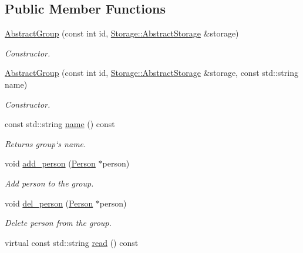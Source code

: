 \subsection*{Public Member Functions}
\begin{DoxyCompactItemize}
\item 
\hyperlink{classCore_1_1AbstractGroup_a9d5c82db4ed051f674e6a3f5586ad5e0}{AbstractGroup} (const int id, \hyperlink{classStorage_1_1AbstractStorage}{Storage::AbstractStorage} \&storage)
\begin{DoxyCompactList}\small\item\em Constructor. \item\end{DoxyCompactList}\item 
\hyperlink{classCore_1_1AbstractGroup_a2b6c9e7b2d618019fe626d28a53ddd06}{AbstractGroup} (const int id, \hyperlink{classStorage_1_1AbstractStorage}{Storage::AbstractStorage} \&storage, const std::string name)
\begin{DoxyCompactList}\small\item\em Constructor. \item\end{DoxyCompactList}\item 
const std::string \hyperlink{classCore_1_1AbstractGroup_a139cc0a6451f2dbca1f74d96f28741f0}{name} () const 
\begin{DoxyCompactList}\small\item\em Returns group`s name. \item\end{DoxyCompactList}\item 
void \hyperlink{classCore_1_1AbstractGroup_a8c59706bf4c5f8e6dc8f931368d97b7f}{add\_\-person} (\hyperlink{classCore_1_1Person}{Person} $\ast$person)
\begin{DoxyCompactList}\small\item\em Add person to the group. \item\end{DoxyCompactList}\item 
void \hyperlink{classCore_1_1AbstractGroup_a378e2ab0f4db0a47906c4341846a143b}{del\_\-person} (\hyperlink{classCore_1_1Person}{Person} $\ast$person)
\begin{DoxyCompactList}\small\item\em Delete person from the group. \item\end{DoxyCompactList}\item 
virtual const std::string \hyperlink{classCore_1_1AbstractGroup_a0306b58e715d164aef3e29de0ec659bd}{read} () const 

\end{DoxyCompactItemize}
